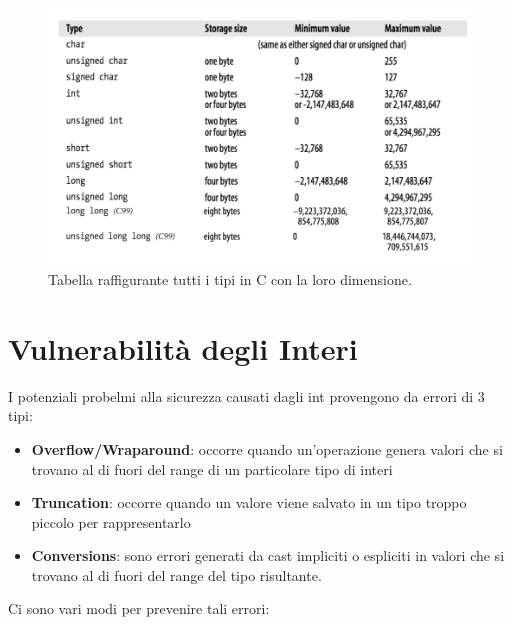 \begin{figure}[H]
    \centering
    \includegraphics[width=13cm, keepaspectratio]{capitoli/secure_coding/img/cap_2/vari_tipi.png}
    \caption{Tabella raffigurante tutti i tipi in C con la loro dimensione.}\label{fig:vari_tipi}
\end{figure}

\section{Vulnerabilità degli Interi}

I potenziali probelmi alla sicurezza causati dagli int provengono da errori di 3 tipi:

\begin{itemize}
    \item \textbf{Overflow/Wraparound}: occorre quando un'operazione genera valori
          che si trovano al di fuori del range di un particolare tipo di interi
    \item \textbf{Truncation}: occorre quando un valore viene salvato in un tipo
          troppo piccolo per rappresentarlo
    \item \textbf{Conversions}: sono errori generati da cast impliciti o espliciti
          in valori che si trovano al di fuori del range del tipo risultante.
\end{itemize}

Ci sono vari modi per prevenire tali errori:

